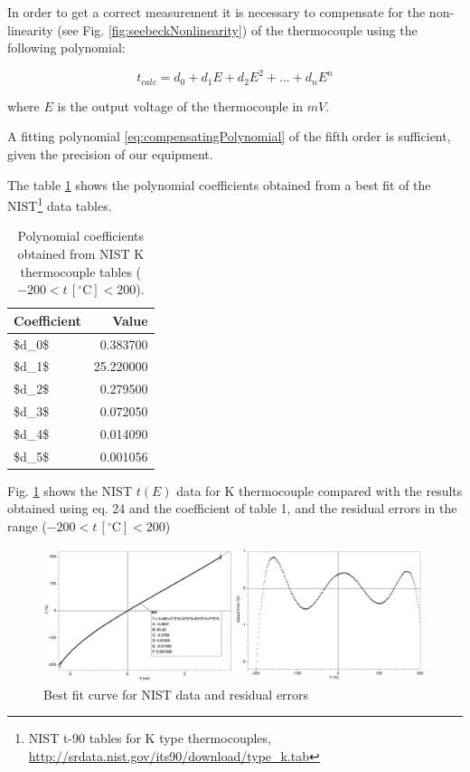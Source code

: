 \documentclass[]{book}
\let\rmarkdownfootnote\footnote%
\def\footnote{\protect\rmarkdownfootnote}
\begin{document}
In order to get a correct measurement it is necessary to compensate for
the non-linearity (see Fig. \ref{fig:seebeckNonlinearity}) of the
thermocouple using the following polynomial:

\begin{equation}
t_{calc}=d_{ 0 }+d_{ 1 }E+d_{ 2 }E^{ 2 }+...+d_{ n }E^{ n }
\label{eq:compensatingPolynomial}
\end{equation}

where \(E\) is the output voltage of the thermocouple in \(mV\).

A fitting polynomial \eqref{eq:compensatingPolynomial} of the fifth order
is sufficient, given the precision of our equipment.

The table \ref{tab:kcoefftable} shows the polynomial coefficients
obtained from a best fit of the NIST\footnote{NIST t-90 tables for K
  type thermocouples,
  \url{http://srdata.nist.gov/its90/download/type_k.tab}} data tables.

\begin{table}

\caption{\label{tab:kcoefftable}Polynomial coefficients obtained from NIST K thermocouple tables ($-200< t \, [^{\circ}\mathrm{C}] <200$).}
\centering
\begin{tabular}[t]{lr}
\toprule
Coefficient & Value\\
\midrule
\$d\_0\$ & 0.383700\\
\$d\_1\$ & 25.220000\\
\$d\_2\$ & 0.279500\\
\$d\_3\$ & 0.072050\\
\$d\_4\$ & 0.014090\\
\$d\_5\$ & 0.001056\\
\bottomrule
\end{tabular}
\end{table}

Fig. \ref{fig:NISTfit} shows the NIST \(t(E)\) data for K thermocouple
compared with the results obtained using eq. 24 and the coefficient of
table 1, and the residual errors in the range
(\(-200< t \, [^{\circ}\mathrm{C}] <200\))

\begin{figure}

{\centering \includegraphics[width=0.65\linewidth]{Assets/Figures/NISTfit} 

}

\caption{Best fit curve for NIST data and residual errors}\label{fig:NISTfit}
\end{figure}
\end{document}
